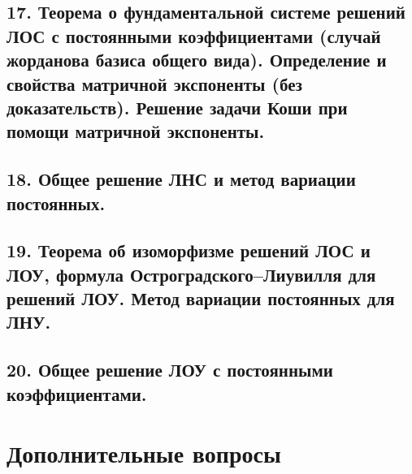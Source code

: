 \subsection*{17. Теорема о фундаментальной системе решений ЛОС с постоянными коэффициентами (случай жорданова базиса общего вида). Определение и свойства матричной экспоненты (без доказательств). Решение задачи Коши при помощи матричной экспоненты.}

\subsection*{18. Общее решение ЛНС и метод вариации постоянных.}

\subsection*{19. Теорема об изоморфизме решений ЛОС и ЛОУ, формула Остроградского–Лиувилля для решений ЛОУ. Метод вариации постоянных для ЛНУ.}

\subsection*{20. Общее решение ЛОУ с постоянными коэффициентами.}





\section*{Дополнительные вопросы}

